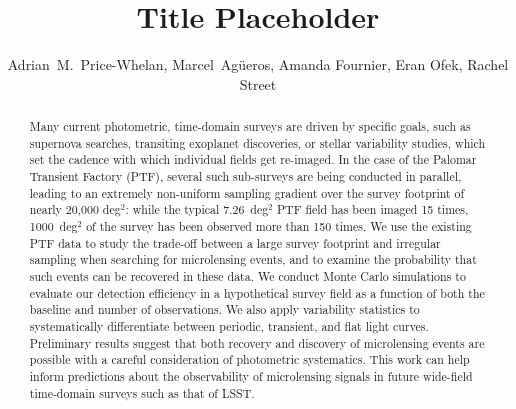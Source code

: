\documentclass[12pt,preprint]{aastex}
\newcounter{address}
\newcommand{\apwsim}{\raisebox{0.2ex}{\scriptsize$\sim$\normalsize}}
\begin{document}
\title{Title Placeholder}
\author{
  Adrian~M.~Price-Whelan\altaffilmark{\ref{col}}, Marcel~Ag\"ueros\altaffilmark{\ref{col}}, Amanda Fournier\altaffilmark{\ref{ucsb}}, Eran Ofek\altaffilmark{\ref{weiz}}, Rachel Street\altaffilmark{\ref{lcogt}}
}


\begin{abstract}
	Many current photometric, time-domain surveys are driven by specific goals, such as supernova searches, transiting exoplanet discoveries, or stellar variability studies, which set the cadence with which individual fields get re-imaged. In the case of the Palomar Transient Factory (PTF), several such sub-surveys are being conducted in parallel, leading to an extremely non-uniform sampling gradient over the survey footprint of nearly 20,000 deg$^2$: while the typical 7.26~deg$^2$ PTF field has been imaged 15 times, \apwsim1000~deg$^2$ of the survey has been observed more than 150 times. We use the existing PTF data to study the trade-off between a large survey footprint and irregular sampling when searching for microlensing events, and to examine the probability that such events can be recovered in these data. We conduct Monte Carlo simulations to evaluate our detection efficiency in a hypothetical survey field as a function of both the baseline and number of observations. We also apply variability statistics to systematically differentiate between periodic, transient, and flat light curves. Preliminary results suggest that both recovery and discovery of microlensing events are possible with a careful consideration of photometric systematics. This work can help inform predictions about the observability of microlensing signals in future wide-field time-domain surveys such as that of LSST.
	
\end{abstract}

\end{document}
